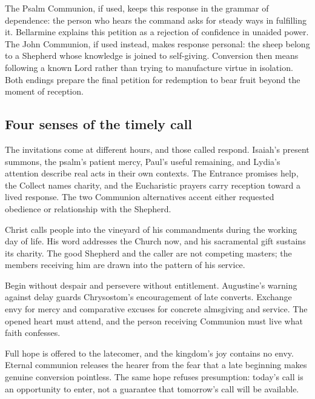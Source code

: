The Psalm Communion, if used, keeps this response in the grammar of dependence: the person who hears the command asks for steady ways in fulfilling it. Bellarmine explains this petition as a rejection of confidence in unaided power. The John Communion, if used instead, makes response personal: the sheep belong to a Shepherd whose knowledge is joined to self-giving. Conversion then means following a known Lord rather than trying to manufacture virtue in isolation. Both endings prepare the final petition for redemption to bear fruit beyond the moment of reception.

\subsection{Four senses of the timely call}
\begin{fourSenses}
\item[Literal.] The invitations come at different hours, and those called respond. Isaiah's present summons, the psalm's patient mercy, Paul's useful remaining, and Lydia's attention describe real acts in their own contexts. The Entrance promises help, the Collect names charity, and the Eucharistic prayers carry reception toward a lived response. The two Communion alternatives accent either requested obedience or relationship with the Shepherd.

\item[Allegorical.] Christ calls people into the vineyard of his commandments during the working day of life. His word addresses the Church now, and his sacramental gift sustains its charity. The good Shepherd and the caller are not competing masters; the members receiving him are drawn into the pattern of his service.

\item[Moral.] Begin without despair and persevere without entitlement. Augustine's warning against delay guards Chrysostom's encouragement of late converts. Exchange envy for mercy and comparative excuses for concrete almsgiving and service. The opened heart must attend, and the person receiving Communion must live what faith confesses.

\item[Anagogical.] Full hope is offered to the latecomer, and the kingdom's joy contains no envy. Eternal communion releases the hearer from the fear that a late beginning makes genuine conversion pointless. The same hope refuses presumption: today's call is an opportunity to enter, not a guarantee that tomorrow's call will be available.
\end{fourSenses}
